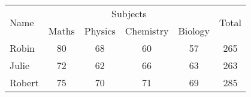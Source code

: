 \documentclass{book}
\begin{document}
\begin{table}[!hbt]
    \begin{tabular}{|l|*{5}{c|}}
        \hline \multirow{2}{*}{Name} & \multicolumn{4}{c|}{Subjects} & \multirow{2}{*}{Total} \\
        \cline{2-5} & Maths & Physics & Chemistry & Biology & \\
        \hline
        \hline Robin & 80 & 68 & 60 & 57 & 265 \\
        \hline Julie & 72 & 62 & 66 & 63 & 263 \\
        \hline Robert & 75 & 70 & 71 & 69 & 285 \\
        \hline
    \end{tabular}
\end{table}
\end{document}
